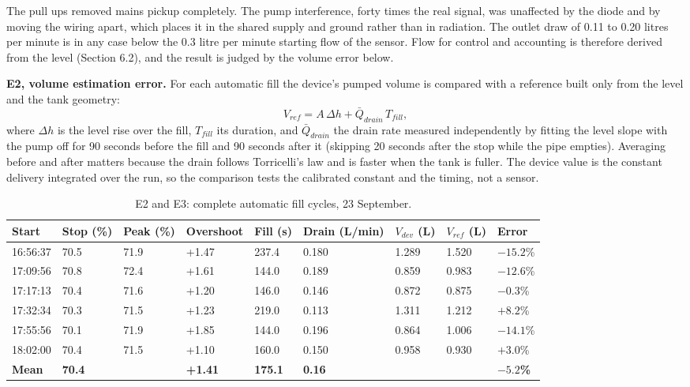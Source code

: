 The pull ups removed mains pickup completely. The pump interference, forty times the real signal, was unaffected by the diode and by moving the wiring apart, which places it in the shared supply and ground rather than in radiation. The outlet draw of 0.11 to 0.20 litres per minute is in any case below the 0.3 litre per minute starting flow of the sensor. Flow for control and accounting is therefore derived from the level (Section 6.2), and the result is judged by the volume error below.

\textbf{E2, volume estimation error.} For each automatic fill the device's pumped volume is compared with a reference built only from the level and the tank geometry:
\begin{equation}
V_{ref} = A\,\Delta h + \bar{Q}_{drain}\,T_{fill},
\end{equation}
where $\Delta h$ is the level rise over the fill, $T_{fill}$ its duration, and $\bar{Q}_{drain}$ the drain rate measured independently by fitting the level slope with the pump off for 90 seconds before the fill and 90 seconds after it (skipping 20 seconds after the stop while the pipe empties). Averaging before and after matters because the drain follows Torricelli's law and is faster when the tank is fuller. The device value is the constant delivery integrated over the run, so the comparison tests the calibrated constant and the timing, not a sensor.

\begin{table}[H]
\caption{E2 and E3: complete automatic fill cycles, 23 September.}
\label{tab:cycles}
\centering
\renewcommand{\arraystretch}{1.05}
\small\setlength{\tabcolsep}{4pt}
\begin{tabular}{|p{1.25cm}|p{1.05cm}|p{1.05cm}|p{1.3cm}|p{1.05cm}|p{1.3cm}|p{1.15cm}|p{1.15cm}|p{1.4cm}|}
\hline
\rowcolor[HTML]{B7E1F0}
\textbf{Start} & \textbf{Stop (\%)} & \textbf{Peak (\%)} & \textbf{Over\-shoot} & \textbf{Fill (s)} & \textbf{Drain (L/min)} & \textbf{$V_{dev}$ (L)} & \textbf{$V_{ref}$ (L)} & \textbf{Error} \\
\hline
16:56:37 & 70.5 & 71.9 & +1.47 & 237.4 & 0.180 & 1.289 & 1.520 & $-15.2$\% \\ \hline
17:09:56 & 70.8 & 72.4 & +1.61 & 144.0 & 0.189 & 0.859 & 0.983 & $-12.6$\% \\ \hline
17:17:13 & 70.4 & 71.6 & +1.20 & 146.0 & 0.146 & 0.872 & 0.875 & $-0.3$\% \\ \hline
17:32:34 & 70.3 & 71.5 & +1.23 & 219.0 & 0.113 & 1.311 & 1.212 & $+8.2$\% \\ \hline
17:55:56 & 70.1 & 71.9 & +1.85 & 144.0 & 0.196 & 0.864 & 1.006 & $-14.1$\% \\ \hline
18:02:00 & 70.4 & 71.5 & +1.10 & 160.0 & 0.150 & 0.958 & 0.930 & $+3.0$\% \\ \hline
\textbf{Mean} & \textbf{70.4} & & \textbf{+1.41} & \textbf{175.1} & \textbf{0.16} & & & $\mathbf{-5.2}$\textbf{\%} \\ \hline
\end{tabular}
\end{table}

